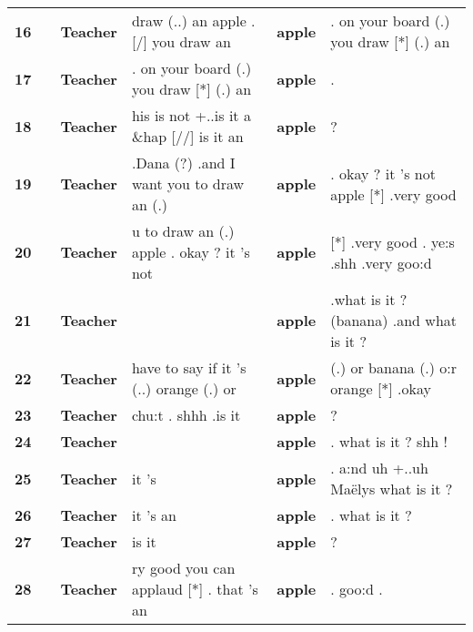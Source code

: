 \documentclass[11pt]{article}
\begin{document}
\begin{flushleft}
\begin{supertabular}{m{0.16085985in}m{0.34345984in}m{0.42475984in}m{2.2163599in}m{0.26635984in}m{2.0837598in}}
\raggedleft \textbf{16} &
 &
\textbf{Teacher} &
\raggedleft [*] draw (..) an apple . [/] you draw an  &
\centering \textbf{apple} &
. on your board (.) you draw [*] (.) an\\
\raggedleft \textbf{17} &
 &
\textbf{Teacher} &
\raggedleft . on your board (.) you draw [*] (.) an  &
\centering \textbf{apple} &
. \\
\raggedleft \textbf{18} &
 &
\textbf{Teacher} &
\raggedleft his is not +..is it a \&hap [//] is it an  &
\centering \textbf{apple} &
? \\
\raggedleft \textbf{19} &
 &
\textbf{Teacher} &
\raggedleft .Dana (?) .and I want you to draw an (.)  &
\centering \textbf{apple} &
. okay ? it 's not apple [*] .very good \\
\raggedleft \textbf{20} &
 &
\textbf{Teacher} &
\raggedleft u to draw an (.) apple . okay ? it 's not  &
\centering \textbf{apple} &
[*] .very good . ye:s .shh .very goo:d \\
\raggedleft \textbf{21} &
 &
\textbf{Teacher} &
 &
\centering \textbf{apple} &
.what is it ?(banana) .and what is it ?\\
\raggedleft \textbf{22} &
 &
\textbf{Teacher} &
\raggedleft have to say if it 's (..) orange (.) or  &
\centering \textbf{apple} &
(.) or banana (.) o:r orange [*] .okay \\
\raggedleft \textbf{23} &
 &
\textbf{Teacher} &
\raggedleft chu:t . shhh .is it  &
\centering \textbf{apple} &
?\\
\raggedleft \textbf{24} &
 &
\textbf{Teacher} &
 &
\centering \textbf{apple} &
. what is it ? shh !\\
\raggedleft \textbf{25} &
 &
\textbf{Teacher} &
\raggedleft it 's  &
\centering \textbf{apple} &
. a:nd uh +..uh Maëlys what is it ? \\
\raggedleft \textbf{26} &
 &
\textbf{Teacher} &
\raggedleft it 's an  &
\centering \textbf{apple} &
. what is it ? \\
\raggedleft \textbf{27} &
 &
\textbf{Teacher} &
\raggedleft is it  &
\centering \textbf{apple} &
? \\
\raggedleft \textbf{28} &
 &
\textbf{Teacher} &
\raggedleft ry good you can applaud [*] . that 's an  &
\centering \textbf{apple} &
. goo:d . \\
\end{supertabular}
\end{flushleft}
\end{document}
